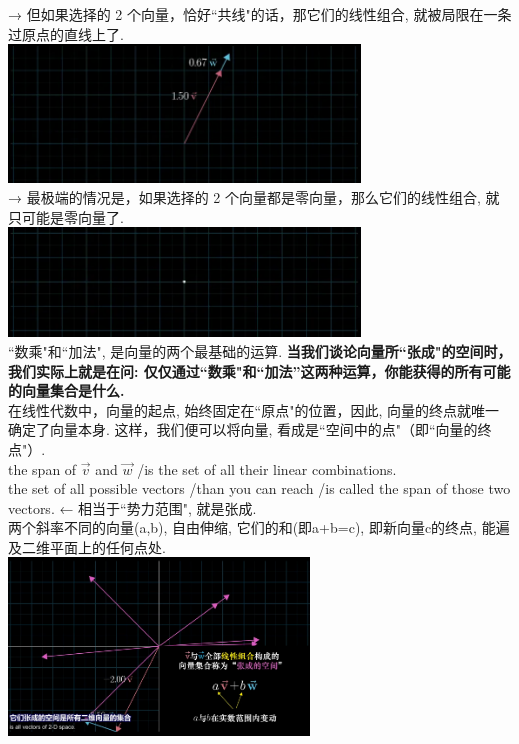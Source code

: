 \documentclass[UTF8]{ctexart}
\begin{document}
→ 但如果选择的 2 个向量，恰好``共线"的话，那它们的线性组合, 就被局限在一条过原点的直线上了. \\
\includegraphics[width=0.7\textwidth]{img/0105.png}\\

→ 最极端的情况是，如果选择的 2 个向量都是零向量，那么它们的线性组合, 就只可能是零向量了. \\
\includegraphics[width=0.7\textwidth]{img/0106.png}\\

``数乘"和``加法", 是向量的两个最基础的运算. \textbf{当我们谈论向量所``张成"的空间时，我们实际上就是在问: 仅仅通过``数乘"和``加法''这两种运算，你能获得的所有可能的向量集合是什么.} \\

在线性代数中，向量的起点, 始终固定在``原点"的位置，因此, 向量的终点就唯一确定了向量本身. 这样，我们便可以将向量, 看成是``空间中的点"（即``向量的终点"）.\\


the span of $\vec{v}$ and $\vec{w} $  /is the set of  all their linear combinations.\\
the set of all possible vectors /than you can reach /is called the span of those two vectors. ← 相当于``势力范围", 就是张成.\\


两个斜率不同的向量(a,b), 自由伸缩, 它们的和(即a+b=c), 即新向量c的终点, 能遍及二维平面上的任何点处.\\

\includegraphics[width=0.6\textwidth]{img/0070.png}\\
\end{document}
